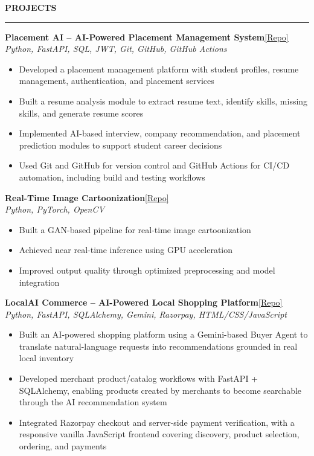 \documentclass[11pt]{article}
\newcommand{\Repo}[1]{\hspace{6pt}\href{#1}{\small[Repo]}}
\renewcommand{\section}[1]{
  \par\vspace{3pt}
  {\large\textbf{#1}}
  \vspace{2pt}
  \hrule
  \vspace{4pt}
}
\begin{document}
\section{PROJECTS}
\textbf{Placement AI -- AI-Powered Placement Management System}\Repo{https://github.com/sid1r/placement_ai} \\
\textit{Python, FastAPI, SQL, JWT, Git, GitHub, GitHub Actions}
\begin{itemize}
\item Developed a placement management platform with student profiles, resume management, authentication, and placement services
\item Built a resume analysis module to extract resume text, identify skills, missing skills, and generate resume scores
\item Implemented AI-based interview, company recommendation, and placement prediction modules to support student career decisions
\item Used Git and GitHub for version control and GitHub Actions for CI/CD automation, including build and testing workflows
\end{itemize}
\vspace{2pt}
\textbf{Real-Time Image Cartoonization}\Repo{https://github.com/sid1r/live-cartoon-cam} \\
\textit{Python, PyTorch, OpenCV}
\begin{itemize}
\item Built a GAN-based pipeline for real-time image cartoonization
\item Achieved near real-time inference using GPU acceleration
\item Improved output quality through optimized preprocessing and model integration
\end{itemize}
\vspace{2pt}
\textbf{LocalAI Commerce -- AI-Powered Local Shopping Platform}\Repo{https://github.com/sid1r/LocalAI_Commerce/tree/main} \\
\textit{Python, FastAPI, SQLAlchemy, Gemini, Razorpay, HTML/CSS/JavaScript}
\begin{itemize}
\item Built an AI-powered shopping platform using a Gemini-based Buyer Agent to translate natural-language requests into recommendations grounded in real local inventory
\item Developed merchant product/catalog workflows with FastAPI + SQLAlchemy, enabling products created by merchants to become searchable through the AI recommendation system
\item Integrated Razorpay checkout and server-side payment verification, with a responsive vanilla JavaScript frontend covering discovery, product selection, ordering, and payments
\end{itemize}
\end{document}
